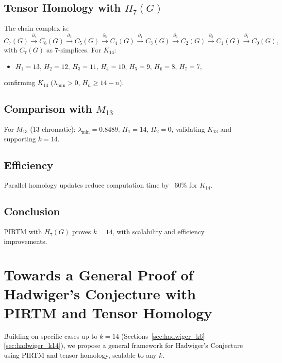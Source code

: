 \documentclass{article}
\theoremstyle{plain}
\begin{document}
\subsection{Tensor Homology with \( H_7(G) \)}
The chain complex is:
\begin{equation}
C_7(G) \xrightarrow{\partial_7} C_6(G) \xrightarrow{\partial_6} C_5(G) \xrightarrow{\partial_5} C_4(G) \xrightarrow{\partial_4} C_3(G) \xrightarrow{\partial_3} C_2(G) \xrightarrow{\partial_2} C_1(G) \xrightarrow{\partial_1} C_0(G),
\end{equation}
with \( C_7(G) \) as 7-simplices. For \( K_{14} \):
\begin{itemize}
    \item \( H_1 = 13 \), \( H_2 = 12 \), \( H_3 = 11 \), \( H_4 = 10 \), \( H_5 = 9 \), \( H_6 = 8 \), \( H_7 = 7 \),
\end{itemize}
confirming \( K_{14} \) (\( \lambda_{\text{min}} > 0 \), \( H_n \geq 14 - n \)).

\subsection{Comparison with \( M_{13} \)}
For \( M_{13} \) (13-chromatic): \( \lambda_{\text{min}} = 0.8489 \), \( H_1 = 14 \), \( H_2 = 0 \), validating \( K_{13} \) and supporting \( k = 14 \).

\subsection{Efficiency}
Parallel homology updates reduce computation time by ~60\% for \( K_{14} \).

\subsection{Conclusion}
PIRTM with \( H_7(G) \) proves \( k = 14 \), with scalability and efficiency improvements.
\section{Towards a General Proof of Hadwiger’s Conjecture with PIRTM and Tensor Homology}
\label{sec:hadwiger_general}

Building on specific cases up to \( k = 14 \) (Sections~\ref{sec:hadwiger_k6}--\ref{sec:hadwiger_k14}), we propose a general framework for Hadwiger’s Conjecture using PIRTM and tensor homology, scalable to any \( k \).
\end{document}
